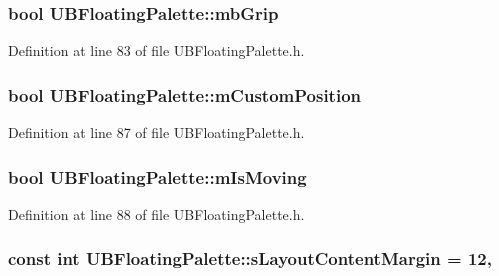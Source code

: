 \hypertarget{class_u_b_floating_palette_a154c8a83dd77e2d02071a46c19976db2}{
\subsubsection[{mb\-Grip}]{\setlength{\rightskip}{0pt plus 5cm}bool U\-B\-Floating\-Palette\-::mb\-Grip\hspace{0.3cm}{\ttfamily [protected]}}}\label{d1/d97/class_u_b_floating_palette_a154c8a83dd77e2d02071a46c19976db2}


Definition at line 83 of file U\-B\-Floating\-Palette.\-h.

\hypertarget{class_u_b_floating_palette_a5fb4099a5276d969d5463eb96df94521}{
\subsubsection[{m\-Custom\-Position}]{\setlength{\rightskip}{0pt plus 5cm}bool U\-B\-Floating\-Palette\-::m\-Custom\-Position\hspace{0.3cm}{\ttfamily [protected]}}}\label{d1/d97/class_u_b_floating_palette_a5fb4099a5276d969d5463eb96df94521}


Definition at line 87 of file U\-B\-Floating\-Palette.\-h.

\hypertarget{class_u_b_floating_palette_a657c2c6a41c9a06ca8d7ec9e5e67a7e9}{
\subsubsection[{m\-Is\-Moving}]{\setlength{\rightskip}{0pt plus 5cm}bool U\-B\-Floating\-Palette\-::m\-Is\-Moving\hspace{0.3cm}{\ttfamily [protected]}}}\label{d1/d97/class_u_b_floating_palette_a657c2c6a41c9a06ca8d7ec9e5e67a7e9}


Definition at line 88 of file U\-B\-Floating\-Palette.\-h.

\hypertarget{class_u_b_floating_palette_aa60468f6497774009446c5761ab73fd0}{
\subsubsection[{s\-Layout\-Content\-Margin}]{\setlength{\rightskip}{0pt plus 5cm}const int U\-B\-Floating\-Palette\-::s\-Layout\-Content\-Margin = 12\hspace{0.3cm}{\ttfamily [static]}, {\ttfamily [protected]}}}\label{d1/d97/class_u_b_floating_palette_aa60468f6497774009446c5761ab73fd0}


